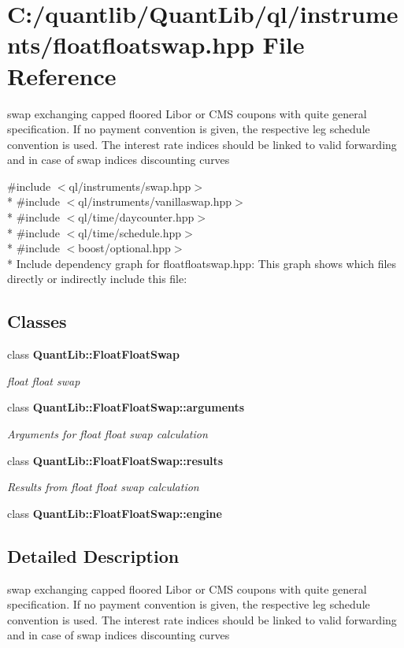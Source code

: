\section{C\+:/quantlib/\+Quant\+Lib/ql/instruments/floatfloatswap.hpp File Reference}
\label{floatfloatswap_8hpp}


swap exchanging capped floored Libor or C\+MS coupons with quite general specification. If no payment convention is given, the respective leg schedule convention is used. The interest rate indices should be linked to valid forwarding and in case of swap indices discounting curves  


{\ttfamily \#include $<$ql/instruments/swap.\+hpp$>$}\\*
{\ttfamily \#include $<$ql/instruments/vanillaswap.\+hpp$>$}\\*
{\ttfamily \#include $<$ql/time/daycounter.\+hpp$>$}\\*
{\ttfamily \#include $<$ql/time/schedule.\+hpp$>$}\\*
{\ttfamily \#include $<$boost/optional.\+hpp$>$}\\*
Include dependency graph for floatfloatswap.\+hpp\+:
This graph shows which files directly or indirectly include this file\+:
\subsection*{Classes}
\begin{DoxyCompactItemize}
\item 
class {\bf Quant\+Lib\+::\+Float\+Float\+Swap}
\begin{DoxyCompactList}\small\item\em float float swap \end{DoxyCompactList}\item 
class {\bf Quant\+Lib\+::\+Float\+Float\+Swap\+::arguments}
\begin{DoxyCompactList}\small\item\em Arguments for float float swap calculation \end{DoxyCompactList}\item 
class {\bf Quant\+Lib\+::\+Float\+Float\+Swap\+::results}
\begin{DoxyCompactList}\small\item\em Results from float float swap calculation \end{DoxyCompactList}\item 
class {\bf Quant\+Lib\+::\+Float\+Float\+Swap\+::engine}
\end{DoxyCompactItemize}


\subsection{Detailed Description}
swap exchanging capped floored Libor or C\+MS coupons with quite general specification. If no payment convention is given, the respective leg schedule convention is used. The interest rate indices should be linked to valid forwarding and in case of swap indices discounting curves 

